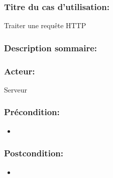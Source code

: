 \documentclass{scrreprt}
\begin{document}
\subsubsection{Titre du cas d'utilisation:} Traiter une requête HTTP
\subsubsection{Description sommaire:} 
\subsubsection{Acteur:} Serveur
\subsubsection{Précondition:}
\begin{itemize}
    \item  
\end{itemize} 
\subsubsection{Postcondition:}
\begin{itemize}
    \item  
\end{itemize} 
\end{document}
